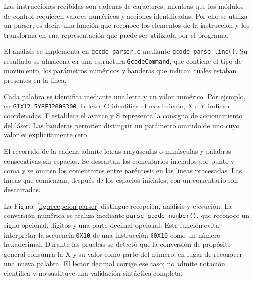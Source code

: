 \documentclass[blue,fullpaper]{ludusofficial}  %
\begin{document}
Las instrucciones recibidas son cadenas de caracteres,
mientras que los módulos de control requieren valores
numéricos y acciones identificadas. Por ello se utiliza
un parser, es decir, una función que reconoce los
elementos de la instrucción y los transforma en una
representación que puede ser utilizada por el programa.

El análisis se implementa en \texttt{gcode\_parser.c}
mediante \texttt{gcode\_parse\_line()}. Su resultado
se almacena en una estructura \texttt{GcodeCommand},
que contiene el tipo de movimiento, los parámetros
numéricos y banderas que indican cuáles estaban
presentes en la línea.

Cada palabra se identifica mediante una letra y
un valor numérico. Por ejemplo, en
\texttt{G1X12.5Y8F1200S300}, la letra G identifica
el movimiento, X e Y indican coordenadas, F establece
el avance y S representa la consigna de accionamiento
del láser. Las banderas permiten distinguir un parámetro
omitido de uno cuyo valor es explícitamente cero.

El recorrido de la cadena admite letras mayúsculas
o minúsculas y palabras consecutivas sin espacios.
Se descartan los comentarios iniciados por punto
y coma y se omiten los comentarios entre paréntesis
en las líneas procesadas. Las líneas que comienzan,
después de los espacios iniciales, con un comentario
son descartadas.

La Figura~\ref{fig:recepcion-parser} distingue recepción, análisis y ejecución. La conversión numérica se realiza mediante
\texttt{parse\_gcode\_number()}, que reconoce un signo
opcional, dígitos y una parte decimal opcional.
Esta función evita interpretar la secuencia
\texttt{0X10} de una instrucción \texttt{G0X10}
como un número hexadecimal. Durante las pruebas se detectó que la conversión de propósito general consumía la X y su valor como parte del número, en lugar de reconocer una nueva palabra. El lector decimal corrige ese caso; no admite notación científica y no sustituye una validación sintáctica completa.
\end{document}
